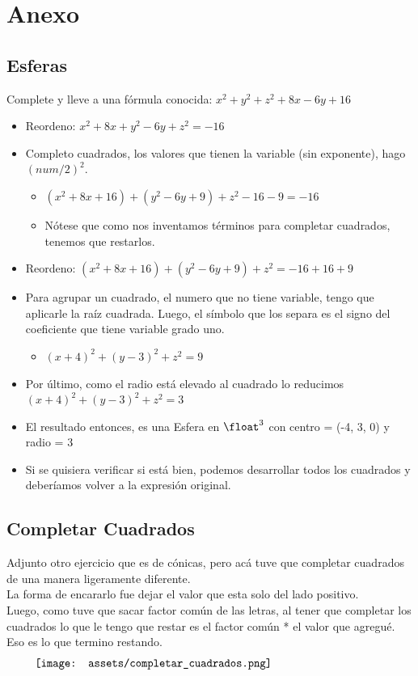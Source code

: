 \documentclass[10pt,a4paper]{article}
\begin{document}
\section*{Anexo}
\subsection*{Esferas}
\label{subsec:completar_cuadrados_esfera}
Complete y lleve a una fórmula conocida: $x^{2} + y^{2} + z^{2} + 8x - 6y + 16$ 
\begin{itemize}
    \item Reordeno: $x^{2} + 8x + y^{2} - 6y +z^{2} = -16$ 
    \item Completo cuadrados, los valores que tienen la variable (sin exponente), hago $(num/2)^{2}$.
    \begin{itemize}
        \item $(x^{2} + 8x + 16) + (y^{2} - 6y + 9) + z^{2} - 16 - 9 = -16$
        \item Nótese que como nos inventamos términos para completar cuadrados, tenemos que restarlos.
    \end{itemize}
    \item Reordeno: $(x^{2} + 8x + 16) + (y^{2} - 6y + 9) + z^{2} = -16 + 16 + 9$
    \item Para agrupar un cuadrado, el numero que no tiene variable, tengo que aplicarle la raíz cuadrada. Luego, el símbolo que los separa es el signo del coeficiente que tiene variable grado uno.
    \begin{itemize}
        \item $(x+4)^{2} + (y-3)^{2} + z^{2} = 9$
    \end{itemize}
    \item Por último, como el radio está elevado al cuadrado lo reducimos $(x+4)^{2} + (y-3)^{2} + z^{2} = 3$
    \item El resultado entonces, es una Esfera en $\float^{3}$ con centro = (-4, 3, 0) y radio = 3
    \item Si se quisiera verificar si está bien, podemos desarrollar todos los cuadrados y deberíamos volver a la expresión original.
\end{itemize}
\subsection*{Completar Cuadrados}
Adjunto otro ejercicio que es de cónicas, pero acá tuve que completar cuadrados de una manera ligeramente diferente. \\
La forma de encararlo fue dejar el valor que esta solo del lado positivo. \\
Luego, como tuve que sacar factor común de las letras, al tener que completar los cuadrados lo que le tengo que restar es el factor común * el valor que agregué. Eso es lo que termino restando. 
\[\begin{minipage}[b]{0.9\textwidth}
    \texttt{[image: assets/completar\_cuadrados.png]}
\end{minipage}\]
\end{document}
